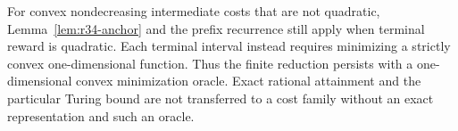 For convex nondecreasing intermediate costs that are not quadratic, Lemma~\ref{lem:r34-anchor} and the prefix recurrence still apply when terminal reward is quadratic. Each terminal interval instead requires minimizing a strictly convex one-dimensional function. Thus the finite reduction persists with a one-dimensional convex minimization oracle. Exact rational attainment and the particular Turing bound are not transferred to a cost family without an exact representation and such an oracle.

